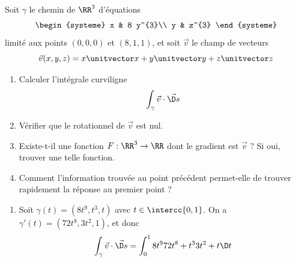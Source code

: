 \documentclass[12pt,french,oneside,a4paper]{memoir} %
\begin{document}
\begin{exo}
Soit $\gamma$ le chemin de $\RR^{3}$ d'équations
\begin{equation*}
  \begin{systeme}
    x & 8 y^{3}\\
    y & z^{3}
  \end{systeme}
\end{equation*}
limité aux points $(0,0,0)$ et $(8,1,1)$, et soit $\vec v$ le champ de vecteurs
\begin{equation*}
  \vec v (x,y,z) = x \unitvector x + y \unitvector y + z \unitvector z
\end{equation*}
\begin{enumerate}
\item Calculer l'intégrale curviligne
  \begin{equation*}
    \int_{\gamma} \vec v\cdot \vec {\D s}
  \end{equation*}
\item Vérifier que le rotationnel de $\vec v$ est nul.
\item Existe-t-il une fonction $F : \RR^{3} \to \RR$ dont le gradient est $\vec v$ ? Si oui, trouver une telle fonction.
\item Comment l'information trouvée au point précédent permet-elle de trouver rapidement la réponse au premier point ?
\end{enumerate}

\begin{correction}
  \begin{enumerate}
  \item Soit $\gamma(t) = (8 t^9, t^3, t)$ avec $t \in \intercc{0,1}$. On a $\gamma'(t) = (72 t^{8}, 3 t^{2}, 1)$, et donc
    \begin{equation*}
      \int_{\gamma} \vec v\cdot \vec {\D s} = \int_{0}^{1} 8 t^{9} 72 t^{8} + t^{3} 3 t^{2} + t \D t
    \end{equation*}
  \end{enumerate}
\end{correction}
\end{exo}
\end{document}
